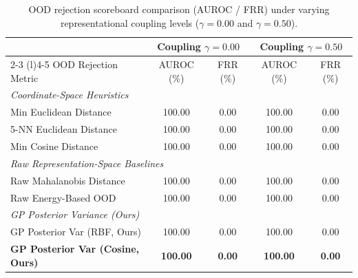 \begin{table}[t]
\caption{OOD rejection scoreboard comparison (AUROC / FRR) under varying representational coupling levels ($\gamma = 0.00$ and $\gamma = 0.50$).}
\label{tab:ood_comparison}
\vskip 0.15in
\begin{center}
\begin{small}
\begin{sc}
\begin{tabular}{lcccc}
\toprule
& \multicolumn{2}{c}{Coupling $\gamma = 0.00$} & \multicolumn{2}{c}{Coupling $\gamma = 0.50$} \\
\cmidrule(r){2-3} \cmidrule(l){4-5}
OOD Rejection Metric & AUROC (\%) & FRR (\%) & AUROC (\%) & FRR (\%) \\
\midrule
\multicolumn{5}{l}{\emph{Coordinate-Space Heuristics}} \\
Min Euclidean Distance & 100.00 & 0.00 & 100.00 & 0.00 \\
5-NN Euclidean Distance & 100.00 & 0.00 & 100.00 & 0.00 \\
Min Cosine Distance & 100.00 & 0.00 & 100.00 & 0.00 \\
\midrule
\multicolumn{5}{l}{\emph{Raw Representation-Space Baselines}} \\
Raw Mahalanobis Distance & 100.00 & 0.00 & 100.00 & 0.00 \\
Raw Energy-Based OOD & 100.00 & 0.00 & 100.00 & 0.00 \\
\midrule
\multicolumn{5}{l}{\emph{GP Posterior Variance (Ours)}} \\
GP Posterior Var (RBF, Ours) & 100.00 & 0.00 & 100.00 & 0.00 \\
\textbf{GP Posterior Var (Cosine, Ours)} & \textbf{100.00} & \textbf{0.00} & \textbf{100.00} & \textbf{0.00} \\
\bottomrule
\end{tabular}%
\end{sc}
\end{small}
\end{center}
\vskip -0.1in
\end{table}

